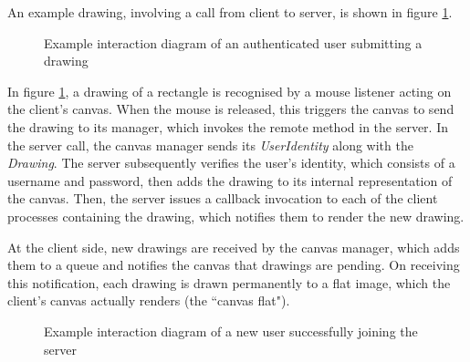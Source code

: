 \documentclass[12pt,a4paper]{article}
\begin{document}
An example drawing, involving a call from client to server, is shown in figure \ref{fig:draw}.

\begin{figure}[h]
\caption{Example interaction diagram of an authenticated user submitting a drawing}
\label{fig:draw}
\centering
\end{figure}

In figure \ref{fig:draw}, a drawing of a rectangle is recognised by a mouse listener acting on the client's canvas. When the mouse is released, this triggers the canvas to send the drawing to its manager, which invokes the remote method in the server. In the server call, the canvas manager sends its \textit{UserIdentity} along with the \textit{Drawing}. The server subsequently verifies the user's identity, which consists of a username and password, then adds the drawing to its internal representation of the canvas. Then, the server issues a callback invocation to each of the client processes containing the drawing, which notifies them to render the new drawing.

At the client side, new drawings are received by the canvas manager, which adds them to a queue and notifies the canvas that drawings are pending. On receiving this notification, each drawing is drawn permanently to a flat image, which the client's canvas actually renders (the ``canvas flat"). 

\begin{figure}[h]
\caption{Example interaction diagram of a new user successfully joining the server}
\label{fig:join}
\centering
\end{figure}
\end{document}
